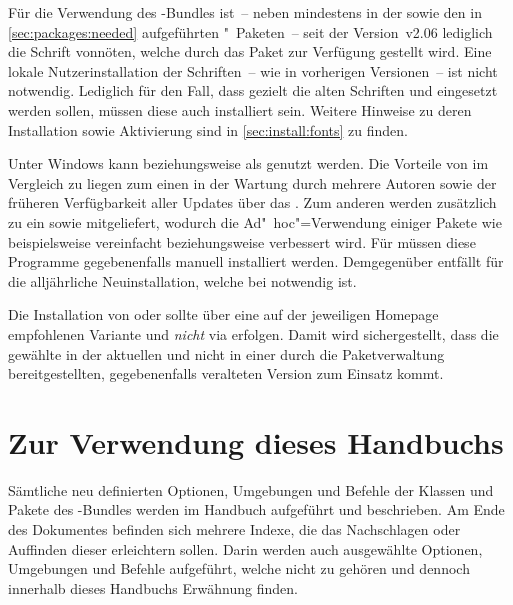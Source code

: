 Für die Verwendung des \TUDScript-Bundles ist~-- neben \KOMAScript mindestens 
in der  sowie den in \autoref{sec:packages:needed} 
aufgeführten "~Paketen~-- seit der Version~v2.06 lediglich die 
Schrift \OpenSans vonnöten, welche durch das Paket  zur 
Verfügung gestellt wird. Eine lokale Nutzerinstallation der Schriften~-- wie in 
vorherigen Versionen~-- ist nicht notwendig. Lediglich für den Fall, dass 
gezielt die alten Schriften \Univers und \DIN eingesetzt werden sollen, müssen 
diese auch installiert sein. Weitere Hinweise zu deren Installation sowie 
Aktivierung sind in \autoref{sec:install:fonts} zu finden.



Unter Windows kann \TeXLive beziehungsweise \MiKTeX als \Distro genutzt werden. 
Die Vorteile von \TeXLive im Vergleich zu \MiKTeX liegen zum einen in der 
Wartung durch mehrere Autoren sowie der früheren Verfügbarkeit aller Updates 
über das \CTAN. Zum anderen werden zusätzlich zu  ein 
 sowie  mitgeliefert, 
wodurch die Ad"~hoc"=Verwendung einiger Pakete wie beispielsweise 
 vereinfacht beziehungsweise verbessert wird. Für 
\MiKTeX müssen diese Programme gegebenenfalls manuell installiert werden. 
Demgegenüber entfällt für \MiKTeX die alljährliche Neuinstallation, welche 
bei \TeXLive notwendig ist.



Die Installation von \href{https://tug.org/texlive/}{\TeXLive} oder 
\href{https://tug.org/mactex/}{\MacTeX} sollte über eine auf der jeweiligen 
Homepage empfohlenen Variante und \emph{nicht} via  
erfolgen. Damit wird sichergestellt, dass die gewählte \Distro in der aktuellen 
und nicht in einer durch die Paketverwaltung bereitgestellten, gegebenenfalls 
veralteten Version zum Einsatz kommt.



\section{Zur Verwendung dieses Handbuchs}

Sämtliche neu definierten Optionen, Umgebungen und Befehle der Klassen und 
Pakete des \TUDScript-Bundles werden im Handbuch aufgeführt und beschrieben. Am 
Ende des Dokumentes befinden sich mehrere Indexe, die das Nachschlagen oder 
Auffinden dieser erleichtern sollen. Darin werden auch ausgewählte Optionen, 
Umgebungen und Befehle aufgeführt, welche nicht zu \TUDScript gehören und 
dennoch innerhalb dieses Handbuchs Erwähnung finden.

